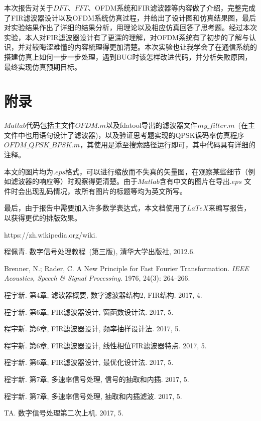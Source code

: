 \documentclass[a4paper,11pt,onecolumn,twoside]{article}
\begin{document}
本次报告对关于$DFT$、$FFT$、OFDM系统和FIR滤波器等内容做了介绍，完整完成了FIR滤波器设计以及OFDM系统仿真过程，并给出了设计图和仿真结果图，最后对实验结果作出了详细的结果分析，用理论以及相应仿真回答了思考题。经过本次实验，本人对FIR滤波器设计有了更深的理解，对OFDM系统有了初步的了解与认识，并对较晦涩难懂的内容梳理得更加清楚。本次实验也让我学会了在通信系统的搭建仿真上如何一步一步处理，遇到BUG时该怎样改进代码，并分析失败原因，最终实现仿真预期目标。


\section{附录}
$Matlab$代码包括主文件$OFDM.m$以及fdatool导出的滤波器文件$my\_filter.m$~(在主文件中也用语句设计了滤波器)，以及验证思考题实现的QPSK误码率仿真程序$OFDM\_QPSK\_BPSK.m$，其使用是添至搜索路径运行即可，其中代码具有详细的注释。

本文的图片均为$.eps$格式，可以进行缩放而不失真的矢量图，在观察某些细节（例如滤波器的响应等）时观察得更清楚。由于$Matlab$含有中文的图片在导出$.eps$ 文件时会出现乱码情况，故所有图片的标题等均为英文所写。

最后，由于报告中需要加入许多数学表达式，本文档使用了$LaTeX$来编写报告，以获得更优的排版效果。

\small
\begin{thebibliography}{99}
\setlength{\parskip}{0pt}  %

https://zh.wikipedia.org/wiki.

程佩青. 数字信号处理教程~(第三版), 清华大学出版社, 2012.6.

Brenner, N.; Rader, C. A New Principle for Fast Fourier Transformation. \emph{IEEE Acoustics, Speech \& Signal Processing}. 1976, 24(3): 264–266.

程宇新. 第4章, 滤波器概要, 数字滤波器结构2, FIR结构. 2017, 4.

程宇新. 第6章, FIR滤波器设计, 窗函数设计法. 2017, 5.

程宇新. 第6章, FIR滤波器设计, 频率抽样设计法. 2017, 5.

程宇新. 第6章, FIR滤波器设计, 线性相位FIR滤波器特点. 2017, 5.

程宇新. 第6章, FIR滤波器设计, 最优化设计法. 2017, 5.

程宇新. 第7章, 多速率信号处理, 信号的抽取和内插. 2017, 5.

程宇新. 第7章, 多速率信号处理, 抽取和内插滤波. 2017, 5.

TA. 数字信号处理第二次上机. 2017, 5.

\end{thebibliography}

\clearpage
\end{document}
